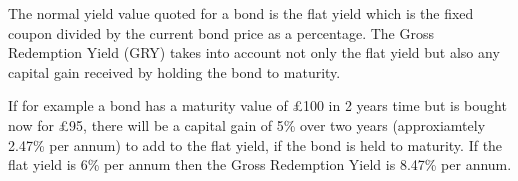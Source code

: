 \documentclass{beamer}
\begin{document}
The normal yield value quoted for a bond is the flat yield which is the fixed coupon divided by the current bond price as a percentage. The Gross Redemption Yield (GRY) takes into account not only the flat yield but also any capital gain received by holding the bond to maturity.

If for example a bond has a maturity value of £100 in 2 years time but is bought now for £95, there will be a capital gain of 5\% over two years (approxiamtely 2.47\% per annum) to add to the flat yield, if the bond is held to maturity. If the flat yield is 6\% per annum then the Gross Redemption Yield is 8.47\% per annum.
\end{document}
